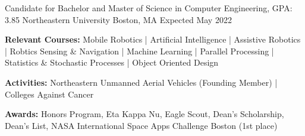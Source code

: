 
\begin{cventries}
  \cventry
    {Candidate for Bachelor and Master of Science in Computer Engineering, GPA: 3.85} %
    {Northeastern University} %
    {Boston, MA} %
    {Expected May 2022} %
    {
      \begin{cvitems} %
         \item {\textbf{Relevant Courses:} Mobile Robotics | Artificial Intelligence | Assistive 
         Robotics | Robtics Sensing \& Navigation | Machine Learning | Parallel Processing | 
         Statistics \& Stochastic Processes | Object Oriented Design}
         \item {\textbf{Activities:} Northeastern Unmanned Aerial Vehicles (Founding Member) | 
         Colleges Against Cancer}
         \item {\textbf{Awards:} Honors Program, Eta Kappa Nu, Eagle Scout, Dean's Scholarship, 
         Dean's List, NASA International Space Apps Challenge Boston (1st place)}
      \end{cvitems}
    }
\end{cventries}
